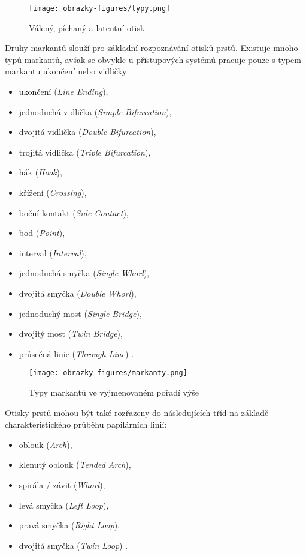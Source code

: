 \begin{figure}[ht!]
    \centering
    \texttt{[image: obrazky-figures/typy.png]}
    \caption{Válený, píchaný a latentní otisk \cite{BIOopora}}
\end{figure}

Druhy markantů slouží pro základní rozpoznávání otisků prstů. Existuje mnoho typů markantů, avšak se obvykle u přístupových systémů pracuje pouze s typem markantu ukončení nebo vidličky:

\begin{itemize}
    \item ukončení (\textit{Line Ending}),
    \item jednoduchá vidlička (\textit{Simple Bifurcation}),
    \item dvojitá vidlička (\textit{Double Bifurcation}),
    \item trojitá vidlička (\textit{Triple Bifurcation}),
    \item hák (\textit{Hook}),
    \item křížení (\textit{Crossing}),
    \item boční kontakt (\textit{Side Contact}),
    \item bod (\textit{Point}),
    \item interval (\textit{Interval}),
    \item jednoduchá smyčka (\textit{Single Whorl}),
    \item dvojitá smyčka (\textit{Double Whorl}),
    \item jednoduchý most (\textit{Single Bridge}),
    \item dvojitý most (\textit{Twin Bridge}),
    \item průsečná linie (\textit{Through Line}) \cite{BIOopora}.\\
\end{itemize}

\begin{figure}[!htbp]
    \centering
    \texttt{[image: obrazky-figures/markanty.png]}
    \caption{Typy markantů ve vyjmenovaném pořadí výše \cite{BIOopora}}
\end{figure}

Otisky prstů mohou být také rozřazeny do následujících tříd na základě charakteristického průběhu papilárních linií:
\begin{itemize}
    \item oblouk (\textit{Arch}),
    \item klenutý oblouk (\textit{Tended Arch}),
    \item spirála / závit (\textit{Whorl}),
    \item levá smyčka (\textit{Left Loop}),
    \item pravá smyčka (\textit{Right Loop}),
    \item dvojitá smyčka (\textit{Twin Loop}) \cite{BIOopora}.
\end{itemize}

